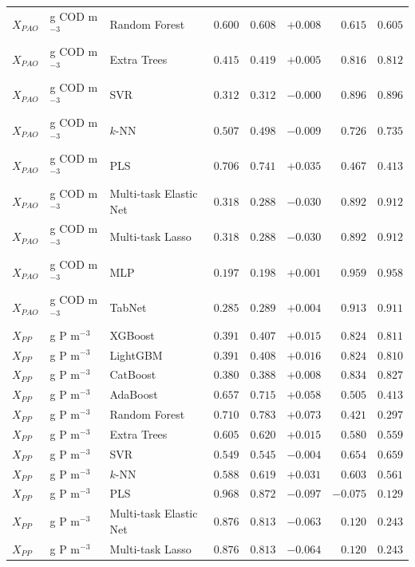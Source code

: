 \begin{longtable}{llp{3.1cm}rrrrr}
$X_{PAO}$ & g COD m$^{-3}$ & Random Forest & $0.600$ & $0.608$ & $+0.008$ & $0.615$ & $0.605$ \\
$X_{PAO}$ & g COD m$^{-3}$ & Extra Trees & $0.415$ & $0.419$ & $+0.005$ & $0.816$ & $0.812$ \\
$X_{PAO}$ & g COD m$^{-3}$ & SVR & $0.312$ & $0.312$ & $-0.000$ & $0.896$ & $0.896$ \\
$X_{PAO}$ & g COD m$^{-3}$ & $k$-NN & $0.507$ & $0.498$ & $-0.009$ & $0.726$ & $0.735$ \\
$X_{PAO}$ & g COD m$^{-3}$ & PLS & $0.706$ & $0.741$ & $+0.035$ & $0.467$ & $0.413$ \\
$X_{PAO}$ & g COD m$^{-3}$ & Multi-task Elastic Net & $0.318$ & $0.288$ & $-0.030$ & $0.892$ & $0.912$ \\
$X_{PAO}$ & g COD m$^{-3}$ & Multi-task Lasso & $0.318$ & $0.288$ & $-0.030$ & $0.892$ & $0.912$ \\
$X_{PAO}$ & g COD m$^{-3}$ & MLP & $0.197$ & $0.198$ & $+0.001$ & $0.959$ & $0.958$ \\
$X_{PAO}$ & g COD m$^{-3}$ & TabNet & $0.285$ & $0.289$ & $+0.004$ & $0.913$ & $0.911$ \\
$X_{PP}$ & g P m$^{-3}$ & XGBoost & $0.391$ & $0.407$ & $+0.015$ & $0.824$ & $0.811$ \\
$X_{PP}$ & g P m$^{-3}$ & LightGBM & $0.391$ & $0.408$ & $+0.016$ & $0.824$ & $0.810$ \\
$X_{PP}$ & g P m$^{-3}$ & CatBoost & $0.380$ & $0.388$ & $+0.008$ & $0.834$ & $0.827$ \\
$X_{PP}$ & g P m$^{-3}$ & AdaBoost & $0.657$ & $0.715$ & $+0.058$ & $0.505$ & $0.413$ \\
$X_{PP}$ & g P m$^{-3}$ & Random Forest & $0.710$ & $0.783$ & $+0.073$ & $0.421$ & $0.297$ \\
$X_{PP}$ & g P m$^{-3}$ & Extra Trees & $0.605$ & $0.620$ & $+0.015$ & $0.580$ & $0.559$ \\
$X_{PP}$ & g P m$^{-3}$ & SVR & $0.549$ & $0.545$ & $-0.004$ & $0.654$ & $0.659$ \\
$X_{PP}$ & g P m$^{-3}$ & $k$-NN & $0.588$ & $0.619$ & $+0.031$ & $0.603$ & $0.561$ \\
$X_{PP}$ & g P m$^{-3}$ & PLS & $0.968$ & $0.872$ & $-0.097$ & $-0.075$ & $0.129$ \\
$X_{PP}$ & g P m$^{-3}$ & Multi-task Elastic Net & $0.876$ & $0.813$ & $-0.063$ & $0.120$ & $0.243$ \\
$X_{PP}$ & g P m$^{-3}$ & Multi-task Lasso & $0.876$ & $0.813$ & $-0.064$ & $0.120$ & $0.243$ \\

\end{longtable}
